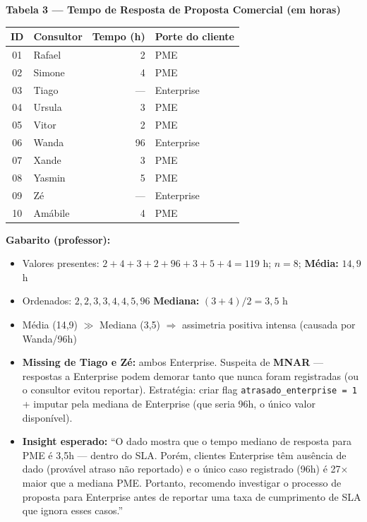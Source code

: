 \begin{BoardBox}
\textbf{Tabela 3 — Tempo de Resposta de Proposta Comercial (em horas)}

\medskip
\begin{tabular}{|c|l|r|l|}
\hline
\textbf{ID} & \textbf{Consultor} & \textbf{Tempo (h)} & \textbf{Porte do cliente} \\
\hline
01 & Rafael   & 2   & PME \\
02 & Simone   & 4   & PME \\
03 & Tiago    & --- & Enterprise \\
04 & Ursula   & 3   & PME \\
05 & Vitor    & 2   & PME \\
06 & Wanda    & 96  & Enterprise \\
07 & Xande    & 3   & PME \\
08 & Yasmin   & 5   & PME \\
09 & Zé       & --- & Enterprise \\
10 & Amábile  & 4   & PME \\
\hline
\end{tabular}
\end{BoardBox}

\begin{SolvedBox}
\textbf{Gabarito (professor):}
\begin{itemize}
  \item Valores presentes: $2+4+3+2+96+3+5+4 = 119$ h; $n=8$; \textbf{Média:} $14{,}9$ h
  \item Ordenados: $2,2,3,3,4,4,5,96$ \quad \textbf{Mediana:} $(3+4)/2 = 3{,}5$ h
  \item Média (14,9) $\gg$ Mediana (3,5) $\Rightarrow$ assimetria positiva intensa (causada por Wanda/96h)
  \item \textbf{Missing de Tiago e Zé:} ambos Enterprise. Suspeita de \textbf{MNAR} — respostas
  a Enterprise podem demorar tanto que nunca foram registradas (ou o consultor evitou reportar).
  Estratégia: criar flag \texttt{atrasado\_enterprise = 1} + imputar pela mediana de Enterprise
  (que seria 96h, o único valor disponível).
  \item \textbf{Insight esperado:} ``O dado mostra que o tempo mediano de resposta para
  PME é 3,5h — dentro do SLA. Porém, clientes Enterprise têm ausência de dado (provável
  atraso não reportado) e o único caso registrado (96h) é 27× maior que a mediana PME.
  Portanto, recomendo investigar o processo de proposta para Enterprise antes de reportar
  uma taxa de cumprimento de SLA que ignora esses casos.''
\end{itemize}
\end{SolvedBox}

